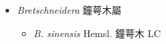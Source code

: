
  \begin{itemize}
 \item[] \textit{Bretschneidera} 鐘萼木屬
                                
  \begin{itemize}
        \item[] \textit{B. sinensis} Hemsl.  鐘萼木   LC
  \end{itemize}
  \end{itemize}
